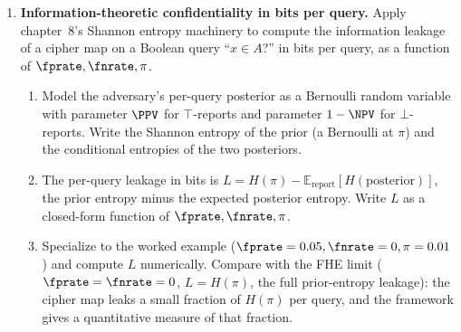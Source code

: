 \begin{enumerate}
\item \exstarstarstar
\label{ex:ch17-11}
\textbf{Information-theoretic confidentiality in bits per
query.}
Apply chapter~8's Shannon entropy machinery to compute the
information leakage of a cipher map on a Boolean query
``$x \in A$?'' in bits per query, as a function of
$\fprate, \fnrate, \pi$.
\begin{enumerate}
  \item[(a)] Model the adversary's per-query posterior as a
    Bernoulli random variable with parameter $\PPV$ for
    $\top$-reports and parameter $1 - \NPV$ for
    $\bot$-reports. Write the Shannon entropy of the prior
    (a Bernoulli at $\pi$) and the conditional entropies of
    the two posteriors.
  \item[(b)] The per-query leakage in bits is
    $L = H(\pi) - \mathbb{E}_{\text{report}}[H(\text{posterior})]$,
    the prior entropy minus the expected posterior entropy.
    Write $L$ as a closed-form function of
    $\fprate, \fnrate, \pi$.
  \item[(c)] Specialize to the 
    worked example ($\fprate = 0.05, \fnrate = 0, \pi = 0.01$)
    and compute $L$ numerically. Compare with the FHE limit
    ($\fprate = \fnrate = 0$, $L = H(\pi)$, the full
    prior-entropy leakage): the cipher map leaks a small
    fraction of $H(\pi)$ per query, and the framework gives
    a quantitative measure of that fraction.
\end{enumerate}

\end{enumerate}
